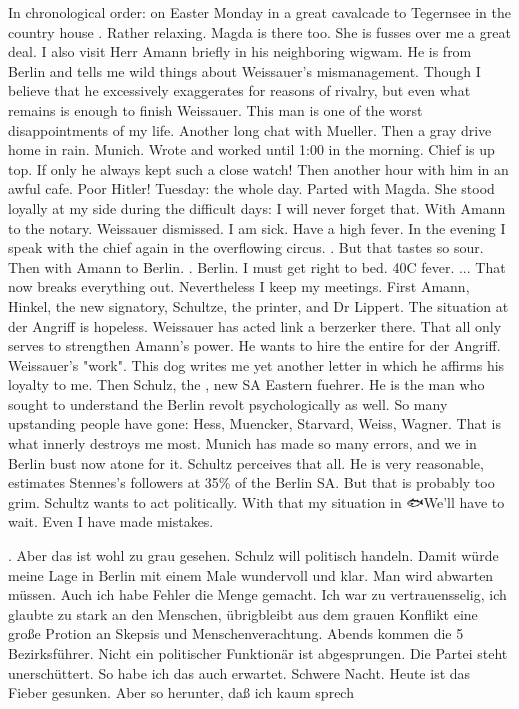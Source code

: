 In chronological order: on Easter Monday in a great cavalcade to Tegernsee in the country house . Rather relaxing. Magda is there too. She is fusses over me a great deal. I also visit Herr Amann briefly in his neighboring wigwam. He is from Berlin and tells me wild things about Weissauer's mismanagement. Though I believe that he excessively exaggerates for reasons of rivalry, but even what remains is enough to finish Weissauer. This man is one of the worst disappointments of my life. Another long chat with Mueller. Then a gray drive home in rain. Munich. Wrote and worked until 1:00 in the morning. Chief is up top. If only he always kept such a close watch! Then another hour with him in an awful cafe. Poor Hitler!
Tuesday:  the whole day. Parted with Magda. She stood loyally at my side during the difficult days: I will never forget that. With Amann to the notary. Weissauer dismissed. I am sick. Have a high fever. In the evening I speak with the chief again in the overflowing circus. . But that tastes so sour. Then with Amann to Berlin. . Berlin. I must get right to bed. 40C fever. ... That now breaks everything out. Nevertheless I keep my meetings. First Amann, Hinkel, the new signatory, Schultze, the printer, and Dr Lippert. The situation at der Angriff is hopeless. Weissauer has acted link a berzerker there. That all only serves to strengthen Amann's power. He wants to hire the entire  for der Angriff. Weissauer's "work". This dog writes me yet another letter in which he affirms his loyalty to me. Then Schulz, the , new SA Eastern fuehrer. He is the man who sought to understand the Berlin revolt psychologically as well. So many upstanding people have gone: Hess, Muencker, Starvard, Weiss, Wagner. That is what innerly destroys me most. Munich has made so many errors, and we in Berlin bust now atone for it. Schultz perceives that all. He is very reasonable, estimates Stennes's followers at 35\% of the Berlin SA. But that is probably too grim. Schultz wants to act politically. With that my situation in 🐟We'll have to wait. Even I have made mistakes.

. Aber das ist wohl zu grau gesehen. Schulz will politisch handeln. Damit würde meine Lage in Berlin mit einem Male wundervoll und klar. Man wird abwarten müssen. Auch ich habe Fehler die Menge gemacht. Ich war zu vertrauensselig, ich glaubte zu stark an den Menschen, übrigbleibt aus dem grauen Konflikt eine große Protion an Skepsis und Menschenverachtung. Abends kommen die 5 Bezirksführer. Nicht ein politischer Funktionär ist abgesprungen. Die Partei steht unerschüttert. So habe ich das auch erwartet. Schwere Nacht. Heute ist das Fieber gesunken. Aber so herunter, daß ich kaum sprech